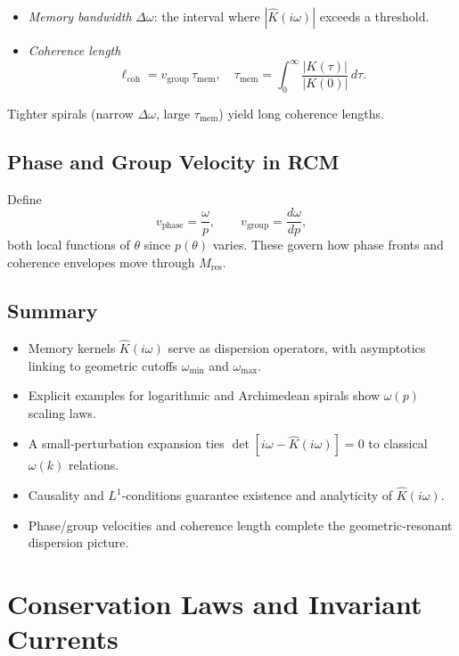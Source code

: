 \begin{itemize}
  \item \emph{Memory bandwidth} $\Delta\omega$: the interval where $|\widehat K(i\omega)|$ exceeds a threshold.
  \item \emph{Coherence length}
    \[
      \ell_{\mathrm{coh}}
      = v_{\mathrm{group}}\,\tau_{\mathrm{mem}},
      \quad
      \tau_{\mathrm{mem}}
      = \int_{0}^{\infty}\frac{|K(\tau)|}{|K(0)|}\,d\tau.
    \]
\end{itemize}
Tighter spirals (narrow $\Delta\omega$, large $\tau_{\mathrm{mem}}$) yield long coherence lengths.

\subsection{Phase and Group Velocity in RCM}

Define
\[
v_{\mathrm{phase}}=\frac{\omega}{p},\qquad
v_{\mathrm{group}}=\frac{d\omega}{dp},
\]
both local functions of $\theta$ since $p(\theta)$ varies.  These govern how phase fronts and coherence envelopes move through $M_{\mathrm{res}}$.

\subsection{Summary}

\begin{itemize}
  \item Memory kernels $\widehat K(i\omega)$ serve as dispersion operators, with asymptotics linking to geometric cutoffs $\omega_{\min}$ and $\omega_{\max}$.  
  \item Explicit examples for logarithmic and Archimedean spirals show $\omega(p)$ scaling laws.
  \item A small‐perturbation expansion ties $\det[i\omega - \widehat K(i\omega)]=0$ to classical $\omega(k)$ relations.
  \item Causality and $L^{1}$‐conditions guarantee existence and analyticity of $\widehat K(i\omega)$.
  \item Phase/group velocities and coherence length complete the geometric‐resonant dispersion picture.
\end{itemize}


\section{Conservation Laws and Invariant Currents}

